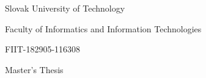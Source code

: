 \begin{center}
\thispagestyle{empty}
{\Large Slovak University of Technology}
\par\end{center}{\Large \par}

\begin{center}
{\Large Faculty of Informatics and Information Technologies}
\par\end{center}{\Large \par}

\smallskip{}

\begin{center}
FIIT-182905-116308
\par\end{center}
\vfill{}

\begin{center}
\textbf{\Large \myName}
\par\end{center}{\Large \par}

\medskip{}


\begin{center}
\textbf{\LARGE \myTitle }
\par\end{center}{\huge \par}

\medskip{}


\begin{center}

{\Large Master's Thesis}
\par\end{center}{\Large \par}

\vfill{}